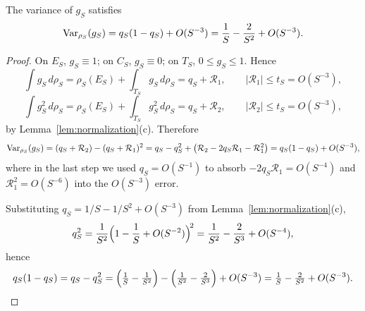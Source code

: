 \begin{lemma}\label{lem:variance}
The variance of $g_S$ satisfies
\[
  \operatorname{Var}_{\rho_S}(g_S)
  = q_S(1-q_S)+O(S^{-3})
  = \frac{1}{S}-\frac{2}{S^2}+O(S^{-3}).
\]
\end{lemma}

\begin{proof}
On $E_S$, $g_S\equiv 1$; on $C_S$, $g_S\equiv 0$; on $T_S$, $0\le g_S\le 1$.
Hence
\[
  \int g_S\,d\rho_S
  = \rho_S(E_S)+\int_{T_S}g_S\,d\rho_S
  = q_S+\mathcal R_1,\qquad |\mathcal R_1|\le t_S=O(S^{-3}),
\]
\[
  \int g_S^2\,d\rho_S
  = \rho_S(E_S)+\int_{T_S}g_S^2\,d\rho_S
  = q_S+\mathcal R_2,\qquad |\mathcal R_2|\le t_S=O(S^{-3}),
\]
by Lemma~\ref{lem:normalization}(c). Therefore
\[
  \operatorname{Var}_{\rho_S}(g_S)
  =(q_S+\mathcal R_2)-(q_S+\mathcal R_1)^2
  = q_S-q_S^2+\bigl(\mathcal R_2-2q_S\mathcal R_1-\mathcal R_1^2\bigr)
  = q_S(1-q_S)+O(S^{-3}),
\]
where in the last step we used $q_S=O(S^{-1})$ to absorb $-2q_S\mathcal R_1
=O(S^{-4})$ and $\mathcal R_1^2=O(S^{-6})$ into the $O(S^{-3})$ error.

Substituting $q_S=1/S-1/S^2+O(S^{-3})$ from
Lemma~\ref{lem:normalization}(c),
\[
  q_S^2
  =\frac{1}{S^2}\Bigl(1-\frac{1}{S}+O(S^{-2})\Bigr)^{\!2}
  =\frac{1}{S^2}-\frac{2}{S^3}+O(S^{-4}),
\]
hence
\[
  q_S(1-q_S)=q_S-q_S^2
  =\Bigl(\tfrac{1}{S}-\tfrac{1}{S^2}\Bigr)-\Bigl(\tfrac{1}{S^2}-\tfrac{2}{S^3}\Bigr)+O(S^{-3})
  =\tfrac{1}{S}-\tfrac{2}{S^2}+O(S^{-3}). \qedhere
\]
\end{proof}
